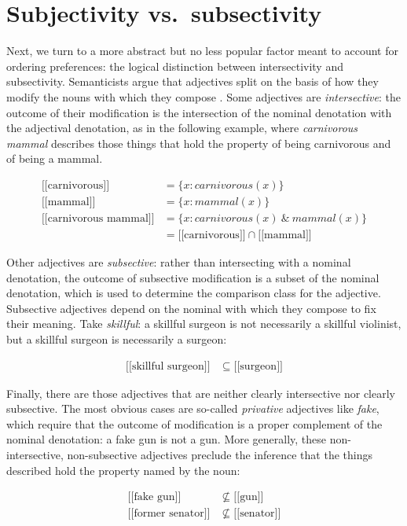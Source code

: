 \documentclass[12pt]{article}
\newcommand{\sem}[1]{\mbox{$[\![$#1$]\!]$}}
\begin{document}
\section{Subjectivity vs.~subsectivity}

Next, we turn to a more abstract but no less popular factor meant to account for ordering preferences: the logical distinction between intersectivity and subsectivity. Semanticists argue that adjectives split on the basis of how they modify the nouns with which they compose \citep[for discussion, see][]{kamppartee1995}. Some adjectives are \emph{intersective}: the outcome of their modification is the intersection of the nominal denotation with the adjectival denotation, as in the following example, where \emph{carnivorous mammal} describes those things that hold the property of being carnivorous and of being a mammal.

\begin{align*} 
\sem{carnivorous} &= \{x : carnivorous(x)\}\\
\sem{mammal} &= \{x : mammal(x)\}\\
\sem{carnivorous mammal} &= \{x : carnivorous(x)\ \&\ mammal(x)\}\\
& =\sem{carnivorous} \cap \sem{mammal}
\end{align*}

\noindent Other adjectives are \emph{subsective}: rather than intersecting with a nominal denotation, the outcome of subsective modification is a subset of the nominal denotation, which is used to determine the comparison class for the adjective. Subsective adjectives depend on the nominal with which they compose to fix their meaning. Take \emph{skillful}: a skillful surgeon is not necessarily a skillful violinist, but a skillful surgeon is necessarily a surgeon:

\begin{align*} 
\sem{skillful surgeon} & \subseteq \sem{surgeon}
\end{align*}

\noindent Finally, there are those adjectives that are neither clearly intersective nor clearly subsective. The most obvious cases are so-called \emph{privative} adjectives like \emph{fake}, which require that the outcome of modification is a proper complement of the nominal denotation: a fake gun is not a gun.  More generally, these non-intersective, non-subsective adjectives preclude the inference that the things described hold the property named by the noun:

\begin{align*} 
\sem{fake gun} & \nsubseteq \sem{gun}\\
\sem{former senator} & \nsubseteq \sem{senator}
\end{align*}
\end{document}
